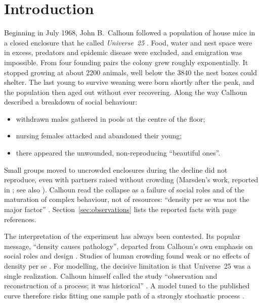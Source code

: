 \section{Introduction}

Beginning in July 1968, John B.~Calhoun followed a population of house mice in a closed enclosure that he called
\emph{Universe~25} \cite{Calhoun1973}.
Food, water and nest space were in excess, predators and epidemic disease were excluded, and emigration was
impossible.
From four founding pairs the colony grew roughly exponentially.
It stopped growing at about 2200 animals, well below the 3840 the nest boxes could shelter.
The last young to survive weaning were born shortly after the peak, and the population then aged out without ever
recovering.
Along the way Calhoun described a breakdown of social behaviour:
\begin{itemize}
\item withdrawn males gathered in pools at the centre of the floor;
\item nursing females attacked and abandoned their young;
\item there appeared the unwounded, non-reproducing ``beautiful ones''.
\end{itemize}
Small groups moved to uncrowded enclosures during the decline did not reproduce, even with partners raised without
crowding (Marsden's work, reported in \cite{Calhoun1973}; see also \cite{Marsden1972}).
Calhoun read the collapse as a failure of social roles and of the maturation of complex behaviour, not of resources:
``density per se was not the major factor'' \cite{Calhoun1973}.
Section~\ref{sec:observations} lists the reported facts with page references.

The interpretation of the experiment has always been contested.
Its popular message, ``density causes pathology'', departed from Calhoun's own emphasis on social roles and design
\cite{RamsdenAdams2009,Ramsden2009,AdamsRamsden2024}.
Studies of human crowding found weak or no effects of density per se \cite{Galle1972,Freedman1975}.
For modelling, the decisive limitation is that Universe~25 was a single realization.
Calhoun himself called the study ``observation and reconstruction of a process; it was historical''
\cite{Calhoun1973}.
A model tuned to the published curve therefore risks fitting one sample path of a strongly stochastic process
\cite{GwizdallaDus2026}.

